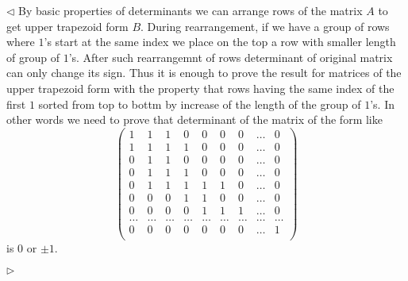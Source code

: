 \documentclass[12pt]{article}
\newenvironment{solution}{\par $\triangleleft$}{$\triangleright$}
\begin{document}
\begin{solution} By basic properties of determinants we can arrange rows of the
    matrix $A$ to get upper trapezoid form $B$. During rearrangement, if we have
    a group of rows where $1$'s start at the same index we place on the top a
    row with smaller length of group of $1$'s. After such rearrangemnt of rows
    determinant of original matrix can only change its sign. Thus it is enough
    to prove the result for matrices of the upper trapezoid form with the
    property that rows having the same index of the first $1$ sorted from top to
    bottm by increase of the length of the group of $1$'s. In other words we
    need to prove that determinant of the matrix of the form like
    $$
        \begin{pmatrix}
            1      &
            1      &
            1      &
            0      &
            0      &
            0      &
            0      &
            \ldots &
            0        \\
            1      &
            1      &
            1      &
            1      &
            0      &
            0      &
            0      &
            \ldots &
            0        \\
            0      &
            1      &
            1      &
            0      &
            0      &
            0      &
            0      &
            \ldots &
            0        \\
            0      &
            1      &
            1      &
            1      &
            0      &
            0      &
            0      &
            \ldots &
            0        \\
            0      &
            1      &
            1      &
            1      &
            1      &
            1      &
            0      &
            \ldots &
            0        \\
            0      &
            0      &
            0      &
            1      &
            1      &
            0      &
            0      &
            \ldots &
            0        \\
            0      &
            0      &
            0      &
            0      &
            1      &
            1      &
            1      &
            \ldots &
            0        \\
            \ldots &
            \ldots &
            \ldots &
            \ldots &
            \ldots &
            \ldots &
            \ldots &
            \ldots &
            \ldots   \\
            0      &
            0      &
            0      &
            0      &
            0      &
            0      &
            0      &
            \ldots &
            1        \\
        \end{pmatrix}
    $$
    is $0$ or $\pm 1$.


\end{solution}
\end{document}

